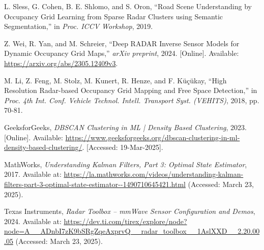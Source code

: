 \begin{thebibliography}{00}
 L. Sless, G. Cohen, B. E. Shlomo, and S. Oron, ``Road Scene Understanding by Occupancy Grid Learning from Sparse Radar Clusters using Semantic Segmentation,'' in \textit{Proc. ICCV Workshop}, 2019.

 Z. Wei, R. Yan, and M. Schreier, ``Deep RADAR Inverse Sensor Models for Dynamic Occupancy Grid Maps,'' \textit{arXiv preprint}, 2024. [Online]. Available: \url{https://arxiv.org/abs/2305.12409v3}.

 M. Li, Z. Feng, M. Stolz, M. Kunert, R. Henze, and F. Küçükay, ``High Resolution Radar-based Occupancy Grid Mapping and Free Space Detection,'' in \textit{Proc. 4th Int. Conf. Vehicle Technol. Intell. Transport Syst. (VEHITS)}, 2018, pp. 70-81.

GeeksforGeeks, 
\emph{DBSCAN Clustering in ML | Density Based Clustering}, 
2023. [Online]. Available: \url{https://www.geeksforgeeks.org/dbscan-clustering-in-ml-density-based-clustering/}. [Accessed: 19-Mar-2025].

MathWorks,
\textit{Understanding Kalman Filters, Part 3: Optimal State Estimator},
2017. Available at: \url{https://la.mathworks.com/videos/understanding-kalman-filters-part-3-optimal-state-estimator--1490710645421.html} (Accessed: March 23, 2025).

Texas Instruments, 
\textit{Radar Toolbox – mmWave Sensor Configuration and Demos}, 
2024. Available at: \url{https://dev.ti.com/tirex/explore/node?node=A__ADnbI7zK9bSRgZqeAxprvQ__radar_toolbox__1AslXXD__2.20.00.05} (Accessed: March 23, 2025).




\end{thebibliography}